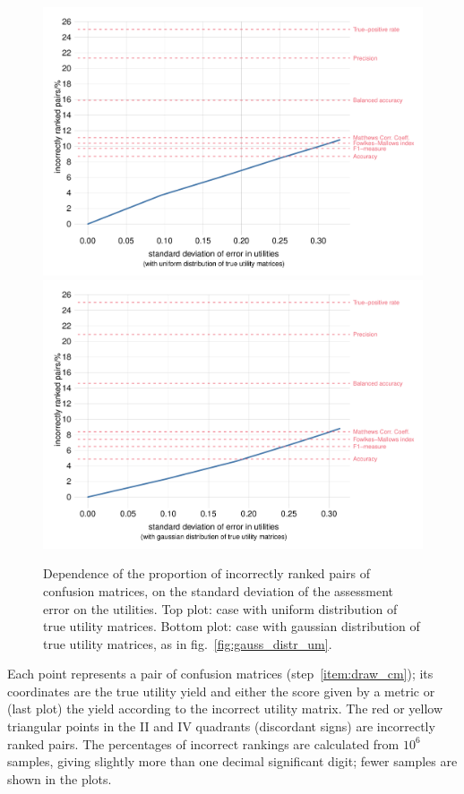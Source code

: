 \documentclass[\ifafour a4paper,12pt,\else a5paper,10pt,\fi%
onecolumn,oneside,article,%
british%
]{memoir}
\theoremstyle{remark}
\theoremstyle{innote}
\renewcommand*{\|}[1][]{\nonscript\:#1\vert\nonscript\:\mathopen{}}
\newcommand*{\fig}{fig.}%
\begin{document}
\begin{figure}[p]
  \centering
    \includegraphics[width=0.99\linewidth]{increase_error2_unif.pdf}\\\hfill
    \includegraphics[width=0.99\linewidth]{increase_error2_norm.pdf}\\\hfill
  \caption{Dependence of the proportion of incorrectly ranked pairs of confusion matrices, on the standard deviation of the assessment error on the utilities. Top plot: case with uniform distribution of true utility matrices. Bottom plot: case with gaussian distribution of true utility matrices, as in \fig~\ref{fig:gauss_distr_um}.}
  \label{fig:percentage_vs_error}
\end{figure}
Each point represents a pair of confusion matrices (step~\ref{item:draw_cm}); its coordinates are the true utility yield and either the score given by a metric or (last plot) the yield according to the incorrect utility matrix. The red or yellow triangular points in the II and IV quadrants (discordant signs) are incorrectly ranked pairs. The percentages of incorrect rankings are calculated from $10^{6}$ samples, giving slightly more than one decimal significant digit; fewer samples are shown in the plots.
\end{document}
